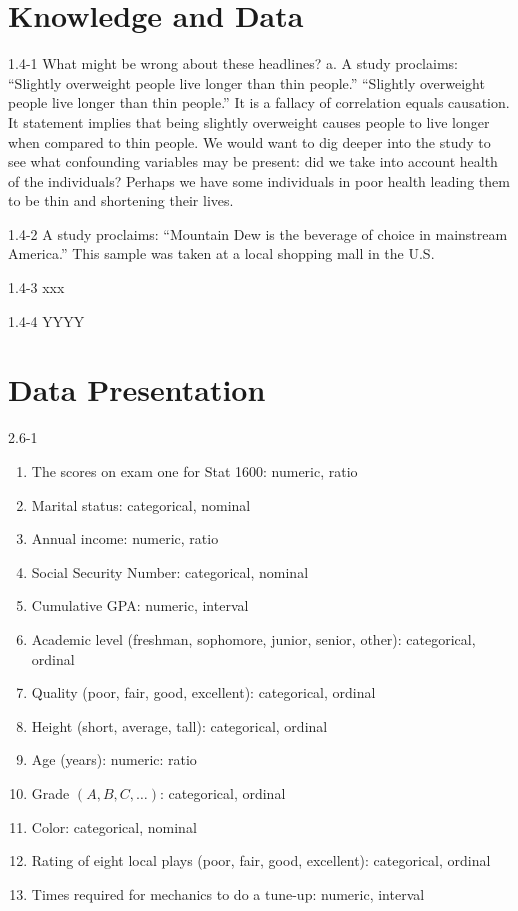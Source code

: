 \setcounter{chapter}{1}\chapter{Knowledge and Data}
\begin{exsol@solution}{1.4-1}
  What might be wrong about these headlines?
  a.	A study proclaims: ``Slightly overweight people live longer than thin people.'' ``Slightly overweight people live longer than thin people.''  It is a fallacy of correlation equals causation.  It statement implies that being slightly overweight causes people to live longer when compared to thin people.  We would want to dig deeper into the study to see what confounding variables may be present: did we take into account health of the individuals?  Perhaps we have some individuals in poor health leading them to be thin and shortening their lives.

\end{exsol@solution}
\begin{exsol@solution}{1.4-2}
  A study proclaims: ``Mountain Dew is the beverage of choice in mainstream America.''  This sample was taken at a local shopping mall in the U.S.
\end{exsol@solution}
\begin{exsol@solution}{1.4-3}
xxx

\end{exsol@solution}
\begin{exsol@solution}{1.4-4}
	   YYYY
\end{exsol@solution}
\setcounter{chapter}{2}\chapter{Data Presentation}
\begin{exsol@solution}{2.6-1}
    \begin{enumerate}
	  \item The scores on exam one for Stat 1600:  numeric, ratio
    \item Marital status: categorical, nominal
    \item Annual income: numeric, ratio
    \item Social Security Number: categorical, nominal
    \item Cumulative GPA: numeric, interval
    \item Academic level (freshman, sophomore, junior, senior, other): categorical, ordinal
    \item Quality (poor, fair, good, excellent): categorical, ordinal
    \item Height (short, average, tall): categorical, ordinal
    \item Age (years): numeric: ratio
    \item Grade $(A, B, C, \dots)$: categorical, ordinal
    \item Color: categorical, nominal
    \item Rating of eight local plays (poor, fair, good, excellent): categorical, ordinal
    \item Times required for mechanics to do a tune-up: numeric, interval
  	\end{enumerate}
\end{exsol@solution}
